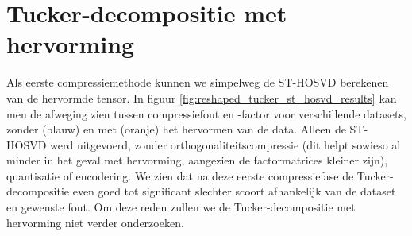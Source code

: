 \section{Tucker-decompositie met hervorming}

Als eerste compressiemethode kunnen we simpelweg de ST-HOSVD berekenen van de hervormde tensor. In figuur \ref{fig:reshaped_tucker_st_hosvd_results} kan men de afweging zien tussen compressiefout en -factor voor verschillende datasets, zonder (blauw) en met (oranje) het hervormen van de data. Alleen de ST-HOSVD werd uitgevoerd, zonder orthogonaliteitscompressie (dit helpt sowieso al minder in het geval met hervorming, aangezien de factormatrices kleiner zijn), quantisatie of encodering. We zien dat na deze eerste compressiefase de Tucker-decompositie even goed tot significant slechter scoort afhankelijk van de dataset en gewenste fout. Om deze reden zullen we de Tucker-decompositie met hervorming niet verder onderzoeken.

